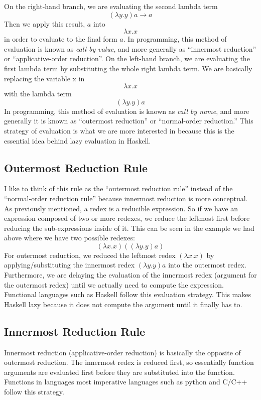 \documentclass{article}
\begin{document}
\medskip\noindent On the right-hand branch, we are evaluating the second lambda term $$(\lambda y.y)a \rightarrow  a$$ Then we apply this result, $a$ into $$\lambda x.x$$ in order to evaluate to the final form $a$. In programming, this method of evaluation is known as \textit{call by value}, and more generally as “innermost reduction” or “applicative-order reduction”.
\newline
\newline On the left-hand branch, we are evaluating the first lambda term by substituting the whole right lambda term. We are basically replacing the variable x in $$\lambda x.x$$ with the lambda term $$(\lambda y.y)a$$ In programming, this method of evaluation is known as \textit{call by name}, and more generally it is known as “outermost reduction” or “normal-order reduction.” This strategy of evaluation is what we are more interested in because this is the essential idea behind lazy evaluation in Haskell.

\subsection{Outermost Reduction Rule}
\medskip\noindent
I like to think of this rule as the “outermost reduction rule” instead of the “normal-order reduction rule” because innermost reduction is more conceptual. As previously mentioned, a redex is a reducible expression. So if we have an expression composed of two or more redexes, we reduce the leftmost first before reducing the sub-expressions inside of it. This can be seen in the example we had above where we have two possible redexes: $$(\lambda x.x) ((\lambda y.y) a)$$
For outermost reduction, we reduced the leftmost redex $(\lambda x.x)$ by applying/substituting the innermost redex $(\lambda y.y)a$ into the outermost redex. Furthermore, we are delaying the evaluation of the innermost redex (argument for the outermost redex) until we actually need to compute the expression. Functional languages such as Haskell follow this evaluation strategy. This makes Haskell lazy because it does not compute the argument until it finally has to.


\subsection{Innermost Reduction Rule}
\medskip\noindent
Innermost reduction (applicative-order reduction) is basically the opposite of outermost reduction. The innermost redex is reduced first, so essentially function arguments are evaluated first before they are substituted into the function. Functions in languages most imperative languages such as python and C/C++ follow this strategy. 
\end{document}
